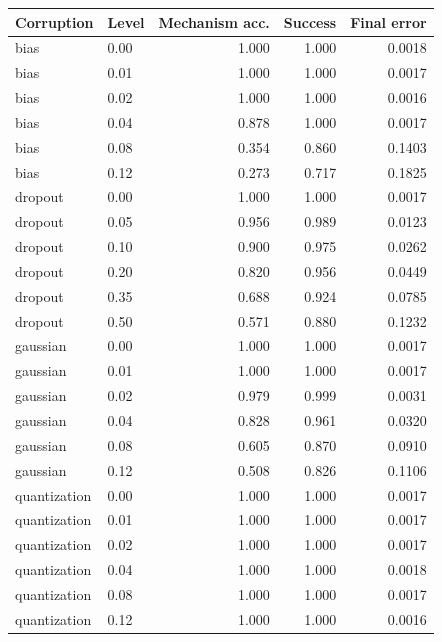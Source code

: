\begin{tabular}{llrrr}
\toprule
Corruption & Level & Mechanism acc. & Success & Final error \\
\midrule
bias & 0.00 & 1.000 & 1.000 & 0.0018 \\
bias & 0.01 & 1.000 & 1.000 & 0.0017 \\
bias & 0.02 & 1.000 & 1.000 & 0.0016 \\
bias & 0.04 & 0.878 & 1.000 & 0.0017 \\
bias & 0.08 & 0.354 & 0.860 & 0.1403 \\
bias & 0.12 & 0.273 & 0.717 & 0.1825 \\
dropout & 0.00 & 1.000 & 1.000 & 0.0017 \\
dropout & 0.05 & 0.956 & 0.989 & 0.0123 \\
dropout & 0.10 & 0.900 & 0.975 & 0.0262 \\
dropout & 0.20 & 0.820 & 0.956 & 0.0449 \\
dropout & 0.35 & 0.688 & 0.924 & 0.0785 \\
dropout & 0.50 & 0.571 & 0.880 & 0.1232 \\
gaussian & 0.00 & 1.000 & 1.000 & 0.0017 \\
gaussian & 0.01 & 1.000 & 1.000 & 0.0017 \\
gaussian & 0.02 & 0.979 & 0.999 & 0.0031 \\
gaussian & 0.04 & 0.828 & 0.961 & 0.0320 \\
gaussian & 0.08 & 0.605 & 0.870 & 0.0910 \\
gaussian & 0.12 & 0.508 & 0.826 & 0.1106 \\
quantization & 0.00 & 1.000 & 1.000 & 0.0017 \\
quantization & 0.01 & 1.000 & 1.000 & 0.0017 \\
quantization & 0.02 & 1.000 & 1.000 & 0.0017 \\
quantization & 0.04 & 1.000 & 1.000 & 0.0018 \\
quantization & 0.08 & 1.000 & 1.000 & 0.0017 \\
quantization & 0.12 & 1.000 & 1.000 & 0.0016 \\
\bottomrule
\end{tabular}
